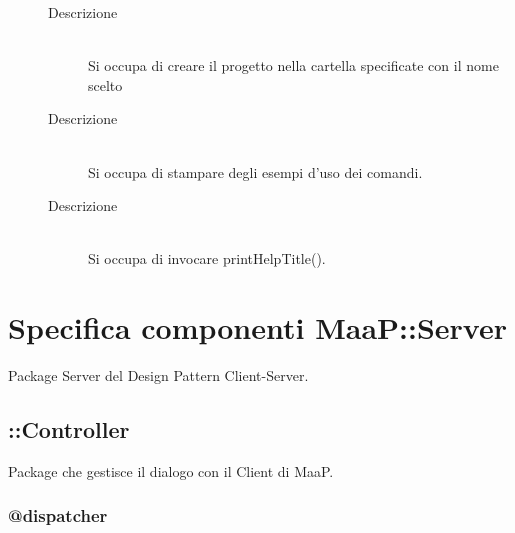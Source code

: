 \begin{description}
\begin{mldescription}
\begin{description}
\begin{description}
                         	     \end{description}
             \item[Descrizione] \hfill \\
             Si occupa di creare il progetto nella cartella specificate con il nome scelto
            \end{description}
       \hfill
                  \begin{description}
                   \item[Descrizione] \hfill \\
                   Si occupa di stampare degli esempi d'uso dei comandi.
                  \end{description}
      \mlitem{*} \hfill
      \begin{description}
      \item[Descrizione] \hfill \\
      Si occupa di invocare printHelpTitle().
      \end{description}
      \end{mldescription}
\end{description}

\section{Specifica componenti MaaP::Server}

Package Server del Design Pattern Client-Server. 

\subsection{::Controller}
Package che gestisce il dialogo con il Client di MaaP. 

\subsubsection{@dispatcher}

